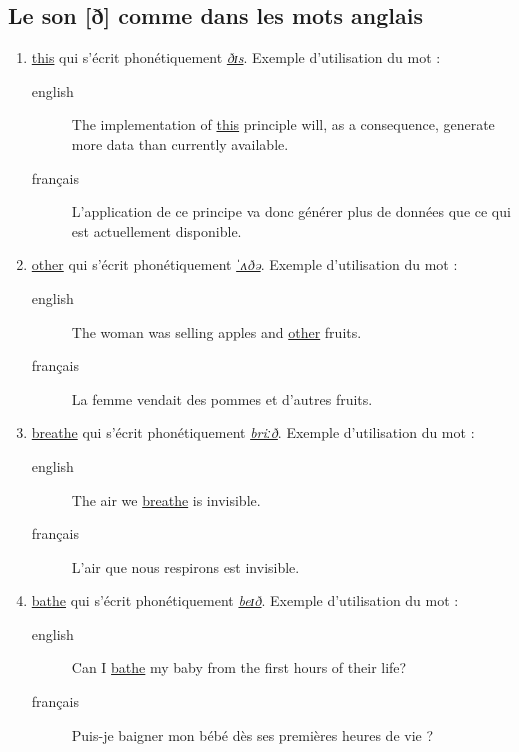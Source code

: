 \documentclass[12pt,a4paper]{book}
\begin{document}
\subsection{Le son [ð] comme dans les mots anglais}
\label{sec:orge02dbdd}
\begin{enumerate}
\item \href{http://www.wordreference.com/enfr/this}{this} qui s'écrit phonétiquement \href{https://en.oxforddictionaries.com/definition/this}{\emph{ðɪs}}. Exemple d'utilisation du mot :
\begin{description}
\item[{english}] \textenglish{The implementation of \href{https://youtu.be/KqzlYTmFBGY}{this} principle will, as a
consequence, generate more data than currently available.}
\item[{français}] L'application de ce principe va donc générer plus de
données que ce qui est actuellement disponible.
\end{description}
\item \href{http://www.wordreference.com/enfr/other}{other} qui s'écrit phonétiquement \href{https://en.oxforddictionaries.com/definition/other}{\emph{ˈʌðə}}. Exemple d'utilisation du mot :
\begin{description}
\item[{english}] \textenglish{The woman was selling apples and \href{https://youtu.be/9gXP8wcICqQ}{other} fruits.}
\item[{français}] La femme vendait des pommes et d'autres fruits.
\end{description}
\item \href{http://www.wordreference.com/enfr/breathe}{breathe} qui s'écrit phonétiquement \href{https://en.oxforddictionaries.com/definition/breathe}{\emph{briːð}}. Exemple d'utilisation du mot :
\begin{description}
\item[{english}] \textenglish{The air we \href{https://youtu.be/V8rtJRlLdI8}{breathe} is invisible.}
\item[{français}] L'air que nous respirons est invisible.
\end{description}
\item \href{http://www.wordreference.com/enfr/bathe}{bathe} qui s'écrit phonétiquement \href{https://dictionary.cambridge.org/dictionary/english/bathe}{\emph{beɪð}}. Exemple d'utilisation du mot :
\begin{description}
\item[{english}] \textenglish{Can I \href{https://youtu.be/U9V8cx2buG0}{bathe} my baby from the first hours of their
life?}
\item[{français}] Puis-je baigner mon bébé dès ses premières heures de
vie ?
\end{description}
\end{enumerate}
\end{document}
